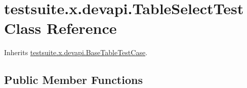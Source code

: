 \hypertarget{classtestsuite_1_1x_1_1devapi_1_1_table_select_test}{}\section{testsuite.\+x.\+devapi.\+Table\+Select\+Test Class Reference}
\label{classtestsuite_1_1x_1_1devapi_1_1_table_select_test}


Inherits \mbox{\hyperlink{classtestsuite_1_1x_1_1devapi_1_1_base_table_test_case}{testsuite.\+x.\+devapi.\+Base\+Table\+Test\+Case}}.

\subsection*{Public Member Functions}
